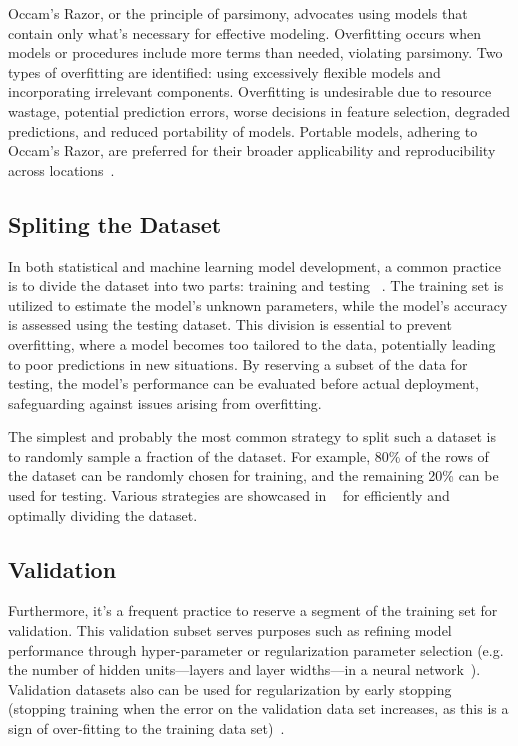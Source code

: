 Occam's Razor, or the principle of parsimony, advocates using models that contain only what's necessary for effective modeling. Overfitting occurs when models or procedures include more terms than needed, violating parsimony. Two types of overfitting are identified: using excessively flexible models and incorporating irrelevant components. Overfitting is undesirable due to resource wastage, potential prediction errors, worse decisions in feature selection, degraded predictions, and reduced portability of models. Portable models, adhering to Occam's Razor, are preferred for their broader applicability and reproducibility across locations~\cite{hawkins2004of,cook2016overfitting}.


\subsection{Spliting the Dataset}

In both statistical and machine learning model development, a common practice is to divide the dataset into two parts: training and testing ~\cite{hastie2009elements}. The training set is utilized to estimate the model's unknown parameters, while the model's accuracy is assessed using the testing dataset. This division is essential to prevent overfitting, where a model becomes too tailored to the data, potentially leading to poor predictions in new situations. By reserving a subset of the data for testing, the model's performance can be evaluated before actual deployment, safeguarding against issues arising from overfitting.

The simplest and probably the most common strategy to split such a dataset is to randomly sample a fraction of the dataset. For example, 80\% of the rows of the dataset can be randomly chosen for training, and the remaining 20\% can be used for testing. Various strategies are showcased in ~\cite{roshan2022split} for efficiently and optimally dividing the dataset.

\subsection{Validation}
\label{sec:cv}
Furthermore, it's a frequent practice to reserve a segment of the training set for validation. This validation subset serves purposes such as refining model performance through hyper-parameter or regularization parameter selection (e.g. the number of hidden units—layers and layer widths—in a neural network~\cite{ripley2007pattern}). Validation datasets also can be used for regularization by early stopping (stopping training when the error on the validation data set increases, as this is a sign of over-fitting to the training data set)~\cite{Prechelt2012}.

